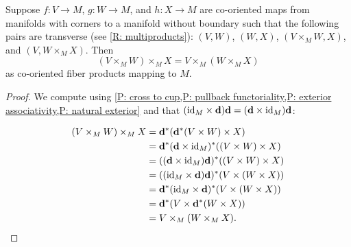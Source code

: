 \begin{corollary}\label{C: fiber assoc}
	Suppose $f \colon V \to M$, $g \colon W \to M$, and $h \colon X \to M$ are co-oriented maps from manifolds with corners to a manifold without boundary such that the following pairs are transverse (see \cref{R: multiproducts}): $(V,W)$, $(W,X)$, $(V \times_M W,X)$, and $(V,W \times_M X)$.
	Then $$(V \times_M W) \times_M X = V \times_M (W \times_M X)$$ as co-oriented fiber products mapping to $M$.
\end{corollary}
\begin{proof}
	We compute using \cref{P: cross to cup,P: pullback functoriality,P: exterior associativity,P: natural exterior} and that $(\mathrm{id}_M \times \mathbf{d})\mathbf{d} = (\mathbf{d} \times \mathrm{id}_M)\mathbf{d}$:

	\begin{align*}
		(V \times_M W) \times_M X& = \mathbf{d}^*(\mathbf{d}^*(V \times W) \times X)\\
		& = \mathbf{d}^*(\mathbf{d} \times \mathrm{id}_M)^*((V \times W) \times X)\\
		& = ((\mathbf{d} \times \mathrm{id}_M)\mathbf{d})^*((V \times W) \times X)\\
		& = ((\mathrm{id}_M \times \mathbf{d})\mathbf{d})^*(V \times (W \times X))\\
		& = \mathbf{d}^*(\mathrm{id}_M \times \mathbf{d})^*(V \times (W \times X))\\
		& = \mathbf{d}^*(V \times \mathbf{d}^*(W \times X))\\
		& = V \times_M (W \times_M X).\qedhere
	\end{align*}
\end{proof}


